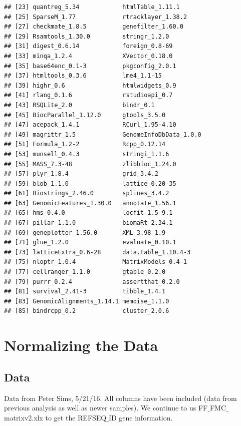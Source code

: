 \documentclass{article}\usepackage[]{graphicx}\usepackage[]{color}
\makeatletter
\newenvironment{kframe}{%
 \def\at@end@of@kframe{}%
 \ifinner\ifhmode%
  \def\at@end@of@kframe{\end{minipage}}%
  \begin{minipage}{\columnwidth}%
 \fi\fi%
 \def\FrameCommand##1{\hskip\@totalleftmargin \hskip-\fboxsep
 \colorbox{shadecolor}{##1}\hskip-\fboxsep
     \hskip-\linewidth \hskip-\@totalleftmargin \hskip\columnwidth}%
 \MakeFramed {\advance\hsize-\width
   \@totalleftmargin\z@ \linewidth\hsize
   \@setminipage}}%
 {\par\unskip\endMakeFramed%
 \at@end@of@kframe}
\newenvironment{knitrout}{}{} %
\makeatother
\begin{document}
\begin{knitrout}
\begin{kframe}
\begin{verbatim}
## [23] quantreg_5.34            htmlTable_1.11.1        
## [25] SparseM_1.77             rtracklayer_1.38.2      
## [27] checkmate_1.8.5          genefilter_1.60.0       
## [29] Rsamtools_1.30.0         stringr_1.2.0           
## [31] digest_0.6.14            foreign_0.8-69          
## [33] minqa_1.2.4              XVector_0.18.0          
## [35] base64enc_0.1-3          pkgconfig_2.0.1         
## [37] htmltools_0.3.6          lme4_1.1-15             
## [39] highr_0.6                htmlwidgets_0.9         
## [41] rlang_0.1.6              rstudioapi_0.7          
## [43] RSQLite_2.0              bindr_0.1               
## [45] BiocParallel_1.12.0      gtools_3.5.0            
## [47] acepack_1.4.1            RCurl_1.95-4.10         
## [49] magrittr_1.5             GenomeInfoDbData_1.0.0  
## [51] Formula_1.2-2            Rcpp_0.12.14            
## [53] munsell_0.4.3            stringi_1.1.6           
## [55] MASS_7.3-48              zlibbioc_1.24.0         
## [57] plyr_1.8.4               grid_3.4.2              
## [59] blob_1.1.0               lattice_0.20-35         
## [61] Biostrings_2.46.0        splines_3.4.2           
## [63] GenomicFeatures_1.30.0   annotate_1.56.1         
## [65] hms_0.4.0                locfit_1.5-9.1          
## [67] pillar_1.1.0             biomaRt_2.34.1          
## [69] geneplotter_1.56.0       XML_3.98-1.9            
## [71] glue_1.2.0               evaluate_0.10.1         
## [73] latticeExtra_0.6-28      data.table_1.10.4-3     
## [75] nloptr_1.0.4             MatrixModels_0.4-1      
## [77] cellranger_1.1.0         gtable_0.2.0            
## [79] purrr_0.2.4              assertthat_0.2.0        
## [81] survival_2.41-3          tibble_1.4.1            
## [83] GenomicAlignments_1.14.1 memoise_1.1.0           
## [85] bindrcpp_0.2             cluster_2.0.6
\end{verbatim}
\end{kframe}
\end{knitrout}

\section{Normalizing the Data}


\subsection{Data}

Data from Peter Sims, 5/21/16.  All columns have been included (data from previous analysis as well as newer samples).  We continue to us FF$\_$FMC$\_$matrixv2.xlx to get the REFSEQ$\_$ID gene information.
\end{document}
